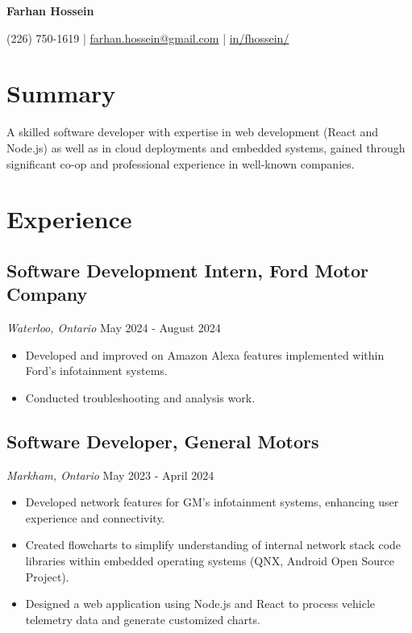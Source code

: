 \documentclass[a4paper,11pt]{article}  %
\begin{document}
\begin{center}
    {\Huge\textbf{Farhan Hossein}}
\end{center}
\vspace{-4mm}

\begin{center}
    \small{
    (226) 750-1619 | \href{mailto:farhan.hossein@gmail.com}{farhan.hossein@gmail.com} | 
    \href{https://linkedin.com/in/fhossein}{in/fhossein/}
    }
\end{center}
\vspace{-6mm}

\section{Summary}
\noindent A skilled software developer with expertise in web development (React and Node.js) as well as in cloud deployments and embedded systems, gained through significant co-op and professional experience in well-known companies.

\section{Experience}

\subsection*{Software Development Intern, Ford Motor Company}
\textit{Waterloo, Ontario} \hfill May 2024 - August 2024
\begin{itemize}
    \item Developed and improved on Amazon Alexa features implemented within Ford's infotainment systems. 
    \item Conducted troubleshooting and analysis work.
\end{itemize}

\subsection*{Software Developer, General Motors}
\textit{Markham, Ontario} \hfill May 2023 - April 2024
\begin{itemize}
    \item Developed network features for GM’s infotainment systems, enhancing user experience and connectivity.
    \item Created flowcharts to simplify understanding of internal network stack code libraries within embedded operating systems (QNX, Android Open Source Project).
    \item Designed a web application using Node.js and React to process vehicle telemetry data and generate customized charts.
\end{itemize}
\end{document}
